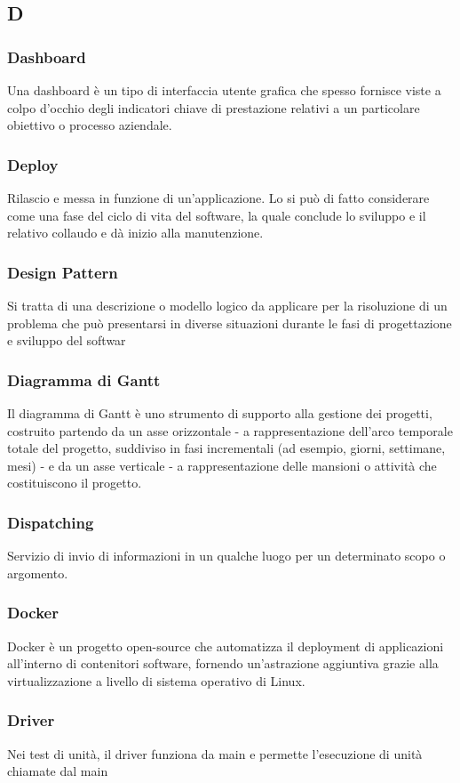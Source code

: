 \subsection*{\textbf{\hfill \Huge{D} \hfill}} 
\subsubsection*{Dashboard}
Una dashboard è un tipo di interfaccia utente grafica che spesso fornisce viste a colpo d’occhio degli indicatori chiave di prestazione relativi a un particolare obiettivo o processo aziendale.
\subsubsection*{Deploy}
Rilascio e messa in funzione di un'applicazione. Lo si può di fatto considerare come una fase del ciclo di vita del software, la quale conclude lo sviluppo e il relativo collaudo e dà inizio alla manutenzione.
\subsubsection*{Design Pattern}
Si tratta di una descrizione o modello logico da applicare per la risoluzione di un problema che può presentarsi in diverse situazioni durante le fasi di progettazione e sviluppo del softwar
\subsubsection*{Diagramma di Gantt}
Il diagramma di Gantt è uno strumento di supporto alla gestione dei progetti, costruito partendo da un asse orizzontale - a rappresentazione dell'arco temporale totale del progetto, suddiviso in fasi incrementali (ad esempio, giorni, settimane, mesi) - e da un asse verticale - a rappresentazione delle mansioni o attività che costituiscono il progetto.
\subsubsection*{Dispatching}
Servizio di invio di informazioni in un qualche luogo per un determinato scopo o argomento.
\subsubsection*{Docker}
Docker è un progetto open-source che automatizza il deployment di applicazioni all'interno di contenitori software, fornendo un'astrazione aggiuntiva grazie alla virtualizzazione a livello di sistema operativo di Linux.
\subsubsection*{Driver}
Nei test di unità, il driver funziona da main e permette l'esecuzione di unità chiamate dal main
